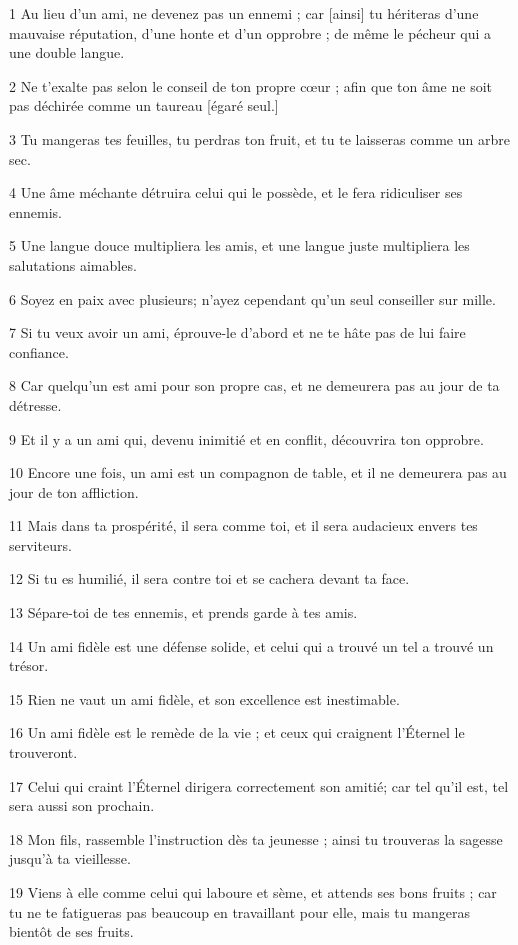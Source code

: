 \par 1 Au lieu d'un ami, ne devenez pas un ennemi ; car [ainsi] tu hériteras d'une mauvaise réputation, d'une honte et d'un opprobre ; de même le pécheur qui a une double langue.
\par 2 Ne t'exalte pas selon le conseil de ton propre cœur ; afin que ton âme ne soit pas déchirée comme un taureau [égaré seul.]
\par 3 Tu mangeras tes feuilles, tu perdras ton fruit, et tu te laisseras comme un arbre sec.
\par 4 Une âme méchante détruira celui qui le possède, et le fera ridiculiser ses ennemis.
\par 5 Une langue douce multipliera les amis, et une langue juste multipliera les salutations aimables.
\par 6 Soyez en paix avec plusieurs; n'ayez cependant qu'un seul conseiller sur mille.
\par 7 Si tu veux avoir un ami, éprouve-le d'abord et ne te hâte pas de lui faire confiance.
\par 8 Car quelqu'un est ami pour son propre cas, et ne demeurera pas au jour de ta détresse.
\par 9 Et il y a un ami qui, devenu inimitié et en conflit, découvrira ton opprobre.
\par 10 Encore une fois, un ami est un compagnon de table, et il ne demeurera pas au jour de ton affliction.
\par 11 Mais dans ta prospérité, il sera comme toi, et il sera audacieux envers tes serviteurs.
\par 12 Si tu es humilié, il sera contre toi et se cachera devant ta face.
\par 13 Sépare-toi de tes ennemis, et prends garde à tes amis.
\par 14 Un ami fidèle est une défense solide, et celui qui a trouvé un tel a trouvé un trésor.
\par 15 Rien ne vaut un ami fidèle, et son excellence est inestimable.
\par 16 Un ami fidèle est le remède de la vie ; et ceux qui craignent l'Éternel le trouveront.
\par 17 Celui qui craint l'Éternel dirigera correctement son amitié; car tel qu'il est, tel sera aussi son prochain.
\par 18 Mon fils, rassemble l'instruction dès ta jeunesse ; ainsi tu trouveras la sagesse jusqu'à ta vieillesse.
\par 19 Viens à elle comme celui qui laboure et sème, et attends ses bons fruits ; car tu ne te fatigueras pas beaucoup en travaillant pour elle, mais tu mangeras bientôt de ses fruits.
